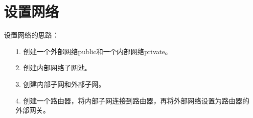 \documentclass[a4paper,left=2.5cm,right=2.5cm,11pt]{article}
\begin{document}
\tableofcontents

\clearpage

\section{设置网络}

	设置网络的思路：
	\begin{itemize}
		\item[1.] 创建一个外部网络public和一个内部网络private。
		\item[2.] 创建内部网络子网池。
		\item[3.] 创建内部子网和外部子网。
		\item[4.] 创建一个路由器，将内部子网连接到路由器，再将外部网络设置为路由器的外部网关。
	\end{itemize}
\end{document}
